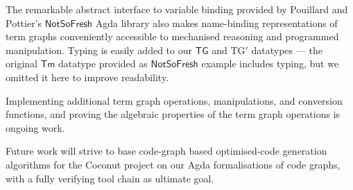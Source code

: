 \documentclass[copyright]{eptcs}
\newcommand{\Conid}[1]{\mathit{#1}}
\newcommand{\Varid}[1]{\mathit{#1}}
\renewcommand\Varid[1]{\mathord{\textsf{#1}}}
\let\Conid\Varid
\newcounter{x}
\newcounter{y}
\begin{document}
The remarkable abstract interface to variable binding provided by
Pouillard and Pottier's \ensuremath{\Conid{NotSoFresh}} Agda library
\cite{Pouillard-Pottier-2010}
also makes name-binding representations of term graphs
conveniently accessible to mechanised reasoning and programmed manipulation.
Typing is easily added to our \ensuremath{\Conid{TG}} and \ensuremath{\Conid{TG′}} datatypes ---
the original \ensuremath{\Conid{Tm}} datatype provided as \ensuremath{\Conid{NotSoFresh}} example
includes typing, but we omitted it here to improve readability.

Implementing additional term graph operations, manipulations, and conversion functions,
and proving the algebraic properties of the term graph operations
is ongoing work.

Future work will strive to base
code-graph based optimised-code generation algorithms
for the Coconut project \cite{Anand-Kahl-2009b}
on our Agda formalisations of code graphs,
with a fully verifying tool chain as ultimate goal.
\end{document}
